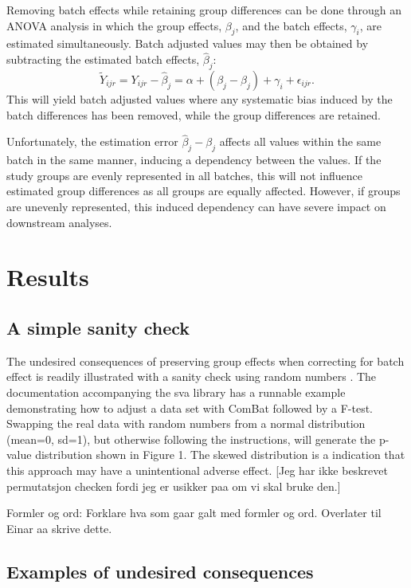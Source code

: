 \documentclass{bio}
\newcommand\NB[1]{{\color{red}#1}}
\newcommand\NOTE[1]{{\color{red}[#1]}}
\begin{document}
Removing batch effects while retaining group differences can be done through an ANOVA analysis in which the group effects, $\beta_j$, and the batch effects, $\gamma_i$, are estimated simultaneously. Batch adjusted values may then be obtained by subtracting the estimated batch effects, $\hat\beta_j$:
\begin{equation}
\widetilde Y_{ijr}=Y_{ijr}-\hat\beta_j=\alpha+(\beta_j-\hat\beta_j)+\gamma_i+\epsilon_{ijr}.
\end{equation}
This will yield batch adjusted values where any systematic bias induced by the batch differences has been removed, while the group differences are retained.

Unfortunately, the estimation error $\hat\beta_j-\beta_j$ affects all values within the same batch in the same manner, inducing a dependency between the values. If the study groups are evenly represented in all batches, this will not influence estimated group differences as all groups are equally affected. However, if groups are unevenly represented, this induced dependency can have severe impact on downstream analyses.


\section{Results}

\subsection{A simple sanity check}

The undesired consequences of preserving group effects when correcting for batch effect is readily illustrated with a sanity check using random numbers . The documentation accompanying the sva library has a runnable example demonstrating how to adjust a data set with ComBat followed by a F-test. Swapping the real data with random numbers from a normal distribution (mean=0, sd=1), but otherwise following the instructions, will generate the p-value distribution shown in Figure 1. The skewed distribution is a indication that this approach may have a unintentional adverse effect. \NOTE{Jeg har ikke beskrevet permutatsjon checken fordi jeg er usikker paa om vi skal bruke den.}


\NB{Formler og ord:
Forklare hva som gaar galt med formler og ord. Overlater til Einar aa skrive dette.}

\subsection{Examples of undesired consequences}
\end{document}
